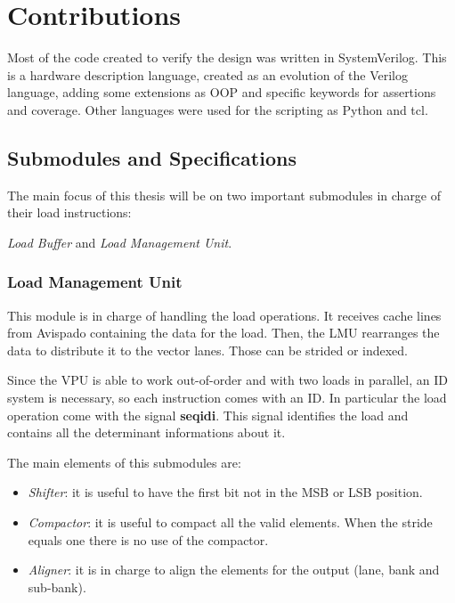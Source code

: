 \chapter{Contributions}
Most of the code created to verify the design was written in SystemVerilog. This is a hardware description language, created as an evolution of the Verilog language, adding some extensions as OOP and specific keywords for assertions and coverage.
Other languages were used for the scripting as Python and tcl.


\section{Submodules and Specifications}


The main focus of this thesis will be on two important submodules in charge of their load instructions:

\textit{Load Buffer} and \textit{Load Management Unit}.

\subsection{Load Management Unit}


This module is in charge of handling the load operations. It receives cache lines from Avispado containing the data for the load. Then, the LMU rearranges the data to distribute it to the vector lanes.
Those can be strided or indexed.

Since the VPU is able to work out-of-order and with two loads in parallel, an ID system is necessary, so each instruction comes with an ID.
In particular the load operation come with the signal \textbf{seq\+id\+i}.
This signal identifies the load and contains all the determinant informations about it.

The main elements of this submodules are:
\begin{itemize}
    \item \textit{Shifter}: it is useful to have the first bit not in the MSB or LSB position.
    
    \item \textit{Compactor}: it is useful to compact all the valid elements. When the stride equals one there is no use of the compactor.
    
    \item \textit{Aligner}: it is in charge to align the elements for the output (lane, bank and sub-bank).
\end{itemize}

